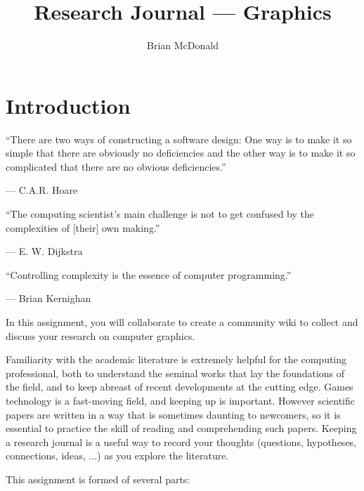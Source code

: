 \documentclass{../../fal_assignment}
\title{Research Journal --- Graphics}
\author{Brian McDonald}
\begin{document}
	
	\maketitle
	
	\section*{Introduction}
	
	\begin{marginquote}
		``There are two ways of constructing a software design: One way is to make it so simple that there are obviously no deficiencies and the other way is to make it so complicated that there are no obvious deficiencies.''
		
		--- C.A.R. Hoare
		
		\marginquoterule
		
		``The computing scientist's main challenge is not to get confused by the complexities of [their] own making.''
		
		--- E. W. Dijkstra
		
		\marginquoterule
		
		``Controlling complexity is the essence of computer programming.''
		
		--- Brian Kernighan
		
	\end{marginquote}
	
	In this assignment, you will collaborate to create a community wiki to collect and discuss your research on computer graphics.
	
	Familiarity with the academic literature is extremely helpful for the computing professional,
	both to understand the seminal works that lay the foundations of the field,
	and to keep abreast of recent developments at the cutting edge.
	Games technology is a fast-moving field, and keeping up is important.
	However scientific papers are written in a way that is sometimes daunting to newcomers,
	so it is essential to practice the skill of reading and comprehending such papers.
	Keeping a research journal is a useful way to record your thoughts
	(questions, hypotheses, connections, ideas, ...) as you explore the literature.
	
	This assignment is formed of several parts:
	
\end{document}
